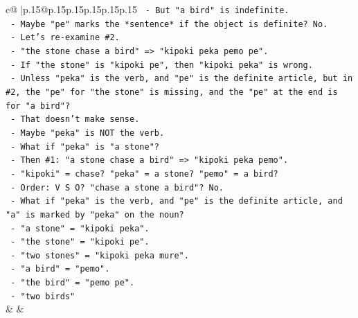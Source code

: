 \documentclass{article}
\begin{document}
{\begin{supertabular}{c@{$\;$}|p{.15\linewidth}@{}p{.15\linewidth}p{.15\linewidth}p{.15\linewidth}p{.15\linewidth}p{.15\linewidth}}
{{{\texttt{                                  {-} But "a bird" is indefinite.} \\
\texttt{                                  {-} Maybe "pe" marks the *sentence* if the object is definite? No.} \\
\texttt{                                  {-} Let's re{-}examine \#2.} \\
\texttt{                                  {-} "the stone chase a bird" => "kipoki peka pemo pe".} \\
\texttt{                                  {-} If "the stone" is "kipoki pe", then "kipoki peka" is wrong.} \\
\texttt{                                  {-} Unless "peka" is the verb, and "pe" is the definite article, but in \#2, the "pe" for "the stone" is missing, and the "pe" at the end is for "a bird"?} \\
\texttt{                                  {-} That doesn't make sense.} \\
\texttt{                                  {-} Maybe "peka" is NOT the verb.} \\
\texttt{                                  {-} What if "peka" is "a stone"?} \\
\texttt{                                  {-} Then \#1: "a stone chase a bird" => "kipoki peka pemo".} \\
\texttt{                                    {-} "kipoki" = chase? "peka" = a stone? "pemo" = a bird?} \\
\texttt{                                    {-} Order: V S O? "chase a stone a bird"? No.} \\
\texttt{                                  {-} What if "peka" is the verb, and "pe" is the definite article, and "a" is marked by "peka" on the noun?} \\
\texttt{                                  {-} "a stone" = "kipoki peka".} \\
\texttt{                                  {-} "the stone" = "kipoki pe".} \\
\texttt{                                  {-} "two stones" = "kipoki peka mure".} \\
\texttt{                                  {-} "a bird" = "pemo".} \\
\texttt{                                  {-} "the bird" = "pemo pe".} \\
\texttt{                                  {-} "two birds"} \\
            }
        }
    }
    & & \\ \\


\end{supertabular}}
\end{document}

